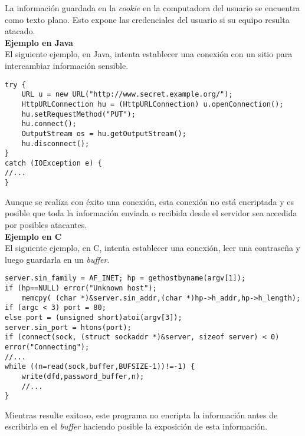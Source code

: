 La información guardada en la \textit{cookie} en la computadora del usuario se encuentra como texto plano.
Esto expone las credenciales del usuario si su equipo resulta atacado. \\

\noindent \textbf{Ejemplo en Java}\\

El siguiente ejemplo, en Java, intenta establecer una conexión con un sitio para intercambiar información sensible.

\begin{lstlisting}[frame=single]
try {
	URL u = new URL("http://www.secret.example.org/");
	HttpURLConnection hu = (HttpURLConnection) u.openConnection();
	hu.setRequestMethod("PUT");
	hu.connect();
	OutputStream os = hu.getOutputStream();
	hu.disconnect();
}
catch (IOException e) {
//...
}
\end{lstlisting}

Aunque se realiza con éxito una conexión, esta conexión no está encriptada y es posible que toda la información enviada o recibida desde el servidor sea accedida por posibles atacantes.\\

\textbf{Ejemplo en C}\\

El siguiente ejemplo, en C, intenta establecer una conexión, leer una contraseña y luego guardarla en un \textit{buffer}.

\begin{lstlisting}[frame=single]
server.sin_family = AF_INET; hp = gethostbyname(argv[1]);
if (hp==NULL) error("Unknown host");
    memcpy( (char *)&server.sin_addr,(char *)hp->h_addr,hp->h_length);
if (argc < 3) port = 80;
else port = (unsigned short)atoi(argv[3]);
server.sin_port = htons(port);
if (connect(sock, (struct sockaddr *)&server, sizeof server) < 0) error("Connecting");
//...
while ((n=read(sock,buffer,BUFSIZE-1))!=-1) {
	write(dfd,password_buffer,n);
	//...
}
\end{lstlisting}

Mientras resulte exitoso, este programa no encripta la información antes de escribirla en el \textit{buffer} haciendo posible la exposición de esta información.

